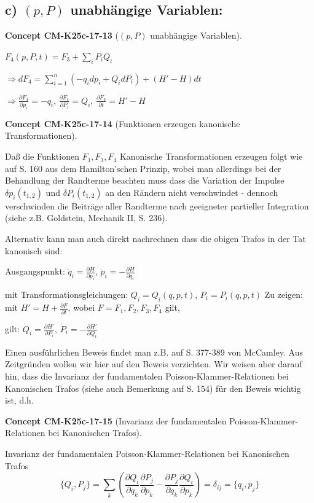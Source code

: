 \documentclass[10pt, letterpaper]{article}
\newcommand{\CustomHeading}[3]{%
  \par\medskip\noindent%
  \textbf{#1 #2} \textnormal{(#3)}.\enskip%
}
\newenvironment{CONC}[2]{\begin{unitbox}\CustomHeading{Concept}{#1}{#2}}{\end{unitbox}}
\begin{document}
\subsection*{c) $(p,P)$ unabhängige Variablen:}

\begin{CONC}{CM-K25c-17-13}{$(p,P)$ unabhängige Variablen}
$F_4(p,P,t) = F_3 + \sum_i P_i Q_i$

$\Rightarrow dF_4 = \sum_{i=1}^n (-q_i dp_i + Q_i dP_i) + (H'-H)dt$

$\Rightarrow \frac{\partial F_4}{\partial p_i} = -q_i$, $\frac{\partial F_4}{\partial P_i} = Q_i$, $\frac{\partial F_4}{\partial t} = H'-H$
\end{CONC}

\begin{CONC}{CM-K25c-17-14}{Funktionen erzeugen kanonische Transformationen}
Daß die Funktionen $F_1, F_3, F_4$ Kanonische Transformationen erzeugen folgt wie auf S. 160 aus dem Hamilton'schen Prinzip, wobei man allerdings bei der Behandlung der Randterme beachten muss dass die Variation der Impulse $\delta p_i(t_{1,2})$ und $\delta P_i(t_{1,2})$ an den Rändern nicht verschwindet - dennoch verschwinden die Beiträge aller Randterme nach geeigneter partieller Integration (siehe z.B. Goldstein, Mechanik II, S. 236).

Alternativ kann man auch direkt nachrechnen dass die obigen Trafos in der Tat kanonisch sind:

Ausgangspunkt: $\dot{q}_i = \frac{\partial H}{\partial p_i}$, $\dot{p}_i = -\frac{\partial H}{\partial q_i}$

mit Transformationsgleichungen:
$Q_i = Q_i(q,p,t)$, $P_i = P_i(q,p,t)$
Zu zeigen: mit $H' = H + \frac{\partial F}{\partial t}$, wobei $F = F_1, F_2, F_3, F_4$ gilt,

gilt: $\dot{Q}_i = \frac{\partial H'}{\partial P_i}$, $\dot{P}_i = -\frac{\partial H'}{\partial Q_i}$
\end{CONC}

Einen ausführlichen Beweis findet man z.B. auf S. 377-389 von McCamley. Aus Zeitgründen wollen wir hier auf den Beweis verzichten. Wir weisen aber darauf hin, dass die Invarianz der fundamentalen Poisson-Klammer-Relationen bei Kanonischen Trafos (siehe auch Bemerkung auf S. 154) für den Beweis wichtig ist, d.h.


\begin{CONC}{CM-K25c-17-15}{Invarianz der fundamentalen Poisson-Klammer-Relationen bei Kanonischen Trafos}
Invarianz der fundamentalen Poisson-Klammer-Relationen bei Kanonischen Trafos
\[
\{Q_i, P_j\} = \sum_k \left(\frac{\partial Q_i}{\partial q_k}\frac{\partial P_j}{\partial p_k} - \frac{\partial P_j}{\partial q_k}\frac{\partial Q_i}{\partial p_k}\right) = \delta_{ij} = \{q_i, p_j\}
\]
\end{CONC}
\end{document}
